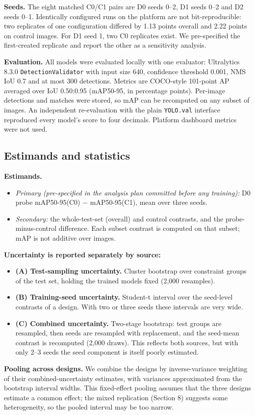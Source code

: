 \documentclass[11pt]{article}
\begin{document}
\textbf{Seeds.} The eight matched C0/C1 pairs are D0 seeds 0--2, D1 seeds 0--2 and D2 seeds 0--1. Identically configured runs on the platform are not bit-reproducible: two replicates of one configuration differed by 1.13 points overall and 2.22 points on control images. For D1 seed 1, two C0 replicates exist. We pre-specified the first-created replicate and report the other as a sensitivity analysis.

\textbf{Evaluation.} All models were evaluated locally with one evaluator: Ultralytics 8.3.0 \texttt{DetectionValidator} with input size 640, confidence threshold 0.001, NMS IoU 0.7 and at most 300 detections. Metrics are COCO-style 101-point AP averaged over IoU 0.50:0.95 (mAP50-95, in percentage points). Per-image detections and matches were stored, so mAP can be recomputed on any subset of images. An independent re-evaluation with the plain \texttt{YOLO.val} interface reproduced every model's score to four decimals. Platform dashboard metrics were not used.

\subsection{Estimands and statistics}
\textbf{Estimands.}

\begin{itemize}
\item \emph{Primary (pre-specified in the analysis plan committed before any training):} D0 probe mAP50-95(C0) $-$ mAP50-95(C1), mean over three seeds.
\item \emph{Secondary:} the whole-test-set (overall) and control contrasts, and the probe-minus-control difference. Each subset contrast is computed on that subset; mAP is not additive over images.
\end{itemize}
\textbf{Uncertainty is reported separately by source:}

\begin{itemize}
\item \textbf{(A) Test-sampling uncertainty.} Cluster bootstrap over constraint groups of the test set, holding the trained models fixed (2,000 resamples).
\item \textbf{(B) Training-seed uncertainty.} Student-t interval over the seed-level contrasts of a design. With two or three seeds these intervals are very wide.
\item \textbf{(C) Combined uncertainty.} Two-stage bootstrap: test groups are resampled, then seeds are resampled with replacement, and the seed-mean contrast is recomputed (2,000 draws). This reflects both sources, but with only 2--3 seeds the seed component is itself poorly estimated.
\end{itemize}
\textbf{Pooling across designs.} We combine the designs by inverse-variance weighting of their combined-uncertainty estimates, with variances approximated from the bootstrap interval widths. This fixed-effect pooling assumes that the three designs estimate a common effect; the mixed replication (Section 8) suggests some heterogeneity, so the pooled interval may be too narrow.
\end{document}
